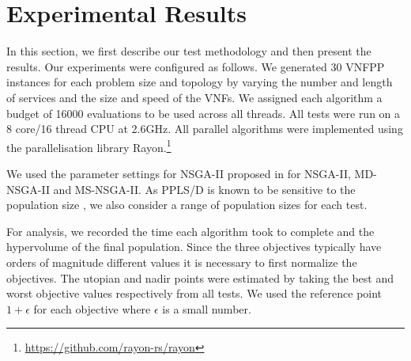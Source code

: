 \section{Experimental Results}
\label{sec:results}

In this section, we first describe our test methodology and then present the results. Our experiments were configured as follows. We generated 30 VNFPP instances for each problem size and topology by varying the number and length of services and the size and speed of the VNFs. We assigned each algorithm a budget of 16000 evaluations to be used across all threads. All tests were run on a 8 core/16 thread CPU at 2.6GHz. All parallel algorithms were implemented using the parallelisation library Rayon.\footnote[1]{\url{https://github.com/rayon-rs/rayon}}

We used the parameter settings for NSGA-II proposed in \cite{DebAPM00} for NSGA-II, MD-NSGA-II and MS-NSGA-II. As PPLS/D is known to be sensitive to the population size \cite{ShiZS20}, we also consider a range of population sizes for each test. 

For analysis, we recorded the time each algorithm took to complete and the hypervolume of the final population. Since the three objectives typically have orders of magnitude different values it is necessary to first normalize the objectives. The utopian and nadir points were estimated by taking the best and worst objective values respectively from all tests. We used the reference point $1 + \epsilon$ for each objective where $\epsilon$ is a small number.

